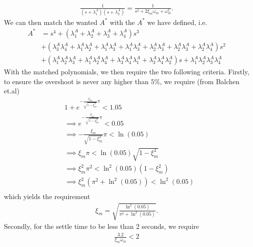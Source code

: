 \documentclass[]{article}
\begin{document}
\begin{equation}\begin{aligned}
\frac{1}{(s + \lambda_1^A)(s + \lambda_2^A)} =
\frac{1}{s^2 + 2 \xi_m \omega_m + \omega^2_m}.
\end{aligned}\end{equation}
We can then match the wanted $A^*$ with the $A^*$ we have defined, i.e.
\begin{equation}\begin{aligned}
\label{eq:A_star_hell}
A^* &= s^4 + (\lambda_1^A + \lambda_2^A + \lambda_3^A + \lambda_4^A)s^3 \\
&+ (\lambda_3^A\lambda_4^A + \lambda_1^A\lambda_2^A + \lambda_1^A\lambda_3^A + \lambda_1^A\lambda_3^A + \lambda_2^A\lambda_3^A + \lambda_2^A\lambda_3^A + \lambda_2^A\lambda_4^A)s^2\\
&+ (\lambda_1^A\lambda_2^A\lambda_3^A + \lambda_1^A\lambda_2^A\lambda_4^A
+ \lambda_3^A\lambda_4^A\lambda_1^A + \lambda_3^A\lambda_4^A\lambda_2^A)s + \lambda_1^A\lambda_2^A\lambda_3^A\lambda_4^A
\end{aligned}\end{equation}
With the matched polynomials, we then require the two following criteria. Firstly, to ensure the overshoot is never any higher than $5\%$, we require (from Balchen et.al)
\begin{equation}\begin{aligned}
&1 + e^{-\frac{\xi_m}{\sqrt{1-\xi^2_m}}\pi} < 1.05\\
&\implies e^{-\frac{\xi_m}{\sqrt{1-\xi^2_m}}\pi} < 0.05\\
&\implies -\frac{\xi_m}{\sqrt{1-\xi^2_m}}\pi < \ln(0.05)\\
&\implies \xi_m \pi < \ln(0.05) \sqrt{1-\xi^2_m} \\
&\implies \xi_m^2 \pi^2 < \ln^2(0.05)(1 - \xi^2_m) \\
&\implies \xi_m^2 (\pi^2 + \ln^2(0.05)) < \ln^2(0.05) \\
\end{aligned}\end{equation}
which yields the requirement
\begin{equation}\begin{aligned}
\xi_m = \sqrt{\frac{\ln^2(0.05)}{\pi^2 + \ln^2(0.05)}}.
\end{aligned}\end{equation}
Secondly, for the settle time to be less than 2 seconds, we require
\begin{equation}\begin{aligned}
\frac{3.2}{\xi_m \omega_m} < 2
\end{aligned}\end{equation}
\end{document}
